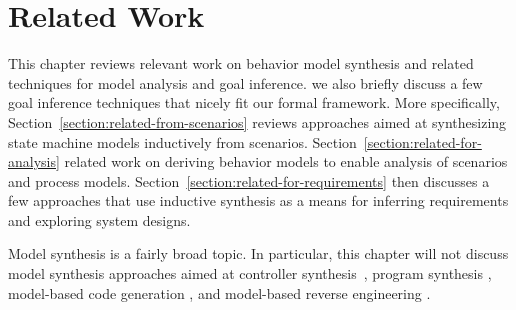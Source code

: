 \chapter{Related Work\label{chapter:related-work}}

This chapter reviews relevant work on behavior model synthesis and related techniques for model analysis and goal inference. we also briefly discuss a few goal inference techniques that nicely fit our formal framework. More specifically, Section~\ref{section:related-from-scenarios} reviews approaches aimed at synthesizing state machine models inductively from scenarios. Section~\ref{section:related-for-analysis} related work on deriving behavior models to enable analysis of scenarios and process models. Section~\ref{section:related-for-requirements} then discusses a few approaches that use inductive synthesis as a means for inferring requirements and exploring system designs.

Model synthesis is a fairly broad topic. In particular, this chapter will not discuss model synthesis approaches aimed at controller synthesis~\cite{Clarke:1981, Pnueli:1989, Asarin:1995}, program synthesis \cite{Manna:1971, Balzer:1985, Wasowski:2003}, model-based code generation \cite{Kohler:2000, Wasowski:2003}, and model-based reverse engineering \cite{Briand:2003, Yu:2005}.





